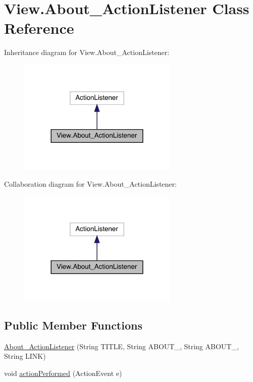 \hypertarget{class_view_1_1_about___action_listener}{}\section{View.\+About\+\_\+\+Action\+Listener Class Reference}
\label{class_view_1_1_about___action_listener}


Inheritance diagram for View.\+About\+\_\+\+Action\+Listener\+:
\nopagebreak
\begin{figure}[H]
\begin{center}
\leavevmode
\includegraphics[width=216pt]{class_view_1_1_about___action_listener__inherit__graph}
\end{center}
\end{figure}


Collaboration diagram for View.\+About\+\_\+\+Action\+Listener\+:
\nopagebreak
\begin{figure}[H]
\begin{center}
\leavevmode
\includegraphics[width=216pt]{class_view_1_1_about___action_listener__coll__graph}
\end{center}
\end{figure}
\subsection*{Public Member Functions}
\begin{DoxyCompactItemize}
\item 
\hyperlink{class_view_1_1_about___action_listener_ae218146933459aaa6c6bbdccf5361967}{About\+\_\+\+Action\+Listener} (String T\+I\+T\+L\+E, String A\+B\+O\+U\+T\+\_, String A\+B\+O\+U\+T\+\_, String L\+I\+N\+K)
\item 
void \hyperlink{class_view_1_1_about___action_listener_aa894598b47ad9ba78c8e1e72aaebc238}{action\+Performed} (Action\+Event e)
\end{DoxyCompactItemize}


